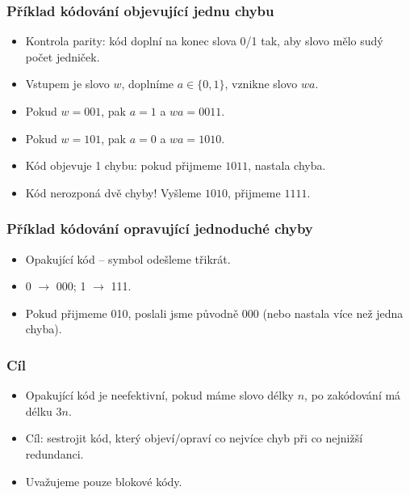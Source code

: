 \documentclass{beamer}
\newenvironment{itemizex}%
  {\large \begin{itemize}%
    \setlength{\itemsep}{8pt}%
    \setlength{\parskip}{8pt}}%
  {\end{itemize}}
\begin{document}
\begin{frame}[t,fragile]\frametitle{Příklad kódování objevující jednu chybu} 
    \begin{itemizex}
        \item Kontrola parity: kód doplní na konec slova 0/1 tak, aby slovo mělo sudý počet jedniček.
        \item Vstupem je slovo $w$, doplníme $a\in\{0,1\}$, vznikne slovo $wa$.
        \item Pokud $w=001$, pak $a=1$ a $wa=0011$.
        \item Pokud $w=101$, pak $a=0$ a $wa=1010$.
        \item Kód objevuje 1 chybu: pokud přijmeme $1011$, nastala chyba.
        \item Kód nerozponá dvě chyby! Vyšleme $1010$, přijmeme $1111$. 
    \end{itemizex}
\end{frame}


\begin{frame}[t,fragile]\frametitle{Příklad kódování opravující jednoduché chyby} 
    \begin{itemizex}
        \item Opakující kód -- symbol odešleme třikrát. 
        \item 0 $\longrightarrow$ 000; 1 $\longrightarrow$ 111.
        \item Pokud přijmeme 010, poslali jsme původně 000 (nebo nastala více než jedna chyba).
    \end{itemizex}
\end{frame}


\begin{frame}[t,fragile]\frametitle{Cíl} 
    \begin{itemizex}
        \item Opakující kód je neefektivní, pokud máme slovo délky $n$, po zakódování má délku $3n$.
        \item Cíl: sestrojit kód, který objeví/opraví co nejvíce chyb při co nejnižší redundanci.
        \item Uvažujeme pouze blokové kódy.
    \end{itemizex}
\end{frame}
\end{document}

